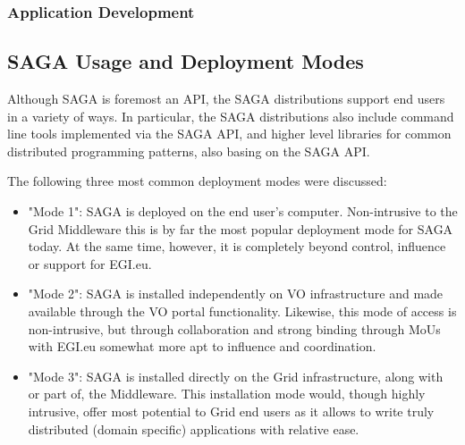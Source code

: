 \documentclass[12pt]{article}
\begin{document}
\subsubsection*{Application Development}






\subsection{SAGA Usage and Deployment Modes}

Although SAGA is foremost an API, the SAGA distributions support end
users in a variety of ways.  In particular, the SAGA distributions
also include command line tools implemented via the SAGA API, and
higher level libraries for common distributed programming patterns,
also basing on the SAGA API.


The following three most common deployment modes were discussed:

\begin{itemize}

\item "Mode 1": SAGA is deployed on the end user's
  computer. Non-intrusive to the Grid Middleware this is by far the
  most popular deployment mode for SAGA today. At the same time,
  however, it is completely beyond control, influence or support for
  EGI.eu.

\item "Mode 2": SAGA is installed independently on VO infrastructure
  and made available through the VO portal functionality. Likewise,
  this mode of access is non-intrusive, but through collaboration and
  strong binding through MoUs with EGI.eu somewhat more apt to
  influence and coordination.

\item "Mode 3": SAGA is installed directly on the Grid infrastructure,
  along with or part of, the Middleware. This installation mode would,
  though highly intrusive, offer most potential to Grid end users as
  it allows to write truly distributed (domain specific) applications
  with relative ease.

\end{itemize}
\end{document}
